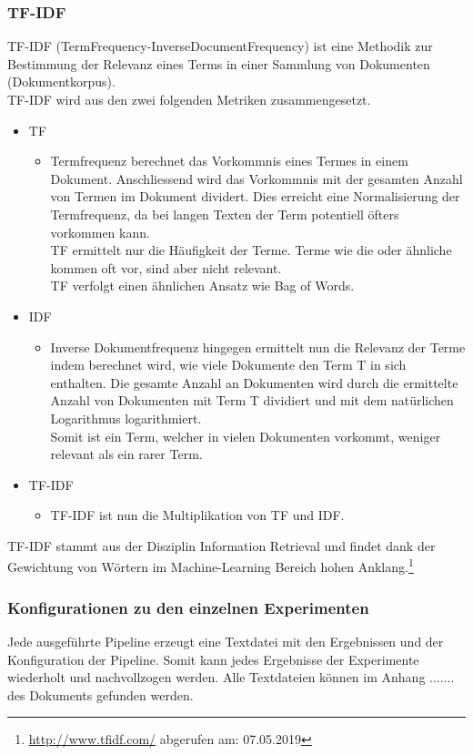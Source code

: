 \subsubsection{TF-IDF}
TF-IDF (TermFrequency-InverseDocumentFrequency) ist eine Methodik zur Bestimmung der Relevanz eines Terms in einer Sammlung von Dokumenten (Dokumentkorpus).\\
TF-IDF wird aus den zwei folgenden Metriken zusammengesetzt.
\begin{itemize}
	\item TF
	\begin{itemize}
		\item Termfrequenz berechnet das Vorkommnis eines Termes in einem Dokument. Anschliessend wird das Vorkommnis mit der gesamten Anzahl von Termen im Dokument dividert. Dies erreicht eine Normalisierung der Termfrequenz, da bei langen Texten der Term potentiell öfters vorkommen kann.\\
		TF ermittelt nur die Häufigkeit der Terme. Terme wie \glqq die\grqq{} oder ähnliche kommen oft vor, sind aber nicht relevant.\\
		TF verfolgt einen ähnlichen Ansatz wie Bag of Words.
	\end{itemize}
	\item IDF
	\begin{itemize}
		\item Inverse Dokumentfrequenz hingegen ermittelt nun die Relevanz der Terme indem berechnet wird, wie viele Dokumente den Term T in sich enthalten. Die gesamte Anzahl an Dokumenten wird durch die ermittelte Anzahl von Dokumenten mit Term T dividiert und mit dem natürlichen Logarithmus logarithmiert.\\
		Somit ist ein Term, welcher in vielen Dokumenten vorkommt, weniger relevant als ein rarer Term.
	\end{itemize}
	\item TF-IDF
	\begin{itemize}
		\item TF-IDF ist nun die Multiplikation von TF und IDF.
	\end{itemize}
\end{itemize}
TF-IDF stammt aus der Disziplin \glqq Information Retrieval\grqq{} und findet dank der Gewichtung von Wörtern im Machine-Learning Bereich hohen Anklang.\footnote{\url{http://www.tfidf.com/} abgerufen am: 07.05.2019}
\subsubsection{Konfigurationen zu den einzelnen Experimenten}
Jede ausgeführte Pipeline erzeugt eine Textdatei mit den Ergebnissen und der Konfiguration der Pipeline.
Somit kann jedes Ergebnisse der Experimente wiederholt und nachvollzogen werden.
Alle Textdateien können im Anhang ....... des Dokuments gefunden werden.
